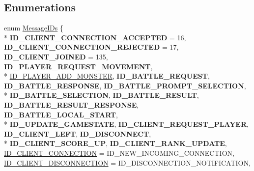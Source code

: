 \subsection*{Enumerations}
\begin{DoxyCompactItemize}
\item 
enum \hyperlink{namespace_champ_net_plugin_a2ade5cfa7cf6c25ab7236c6b54a57821}{Message\-I\-Ds} \{ \\*
{\bfseries I\-D\-\_\-\-C\-L\-I\-E\-N\-T\-\_\-\-C\-O\-N\-N\-E\-C\-T\-I\-O\-N\-\_\-\-A\-C\-C\-E\-P\-T\-E\-D} = 16, 
{\bfseries I\-D\-\_\-\-C\-L\-I\-E\-N\-T\-\_\-\-C\-O\-N\-N\-E\-C\-T\-I\-O\-N\-\_\-\-R\-E\-J\-E\-C\-T\-E\-D} = 17, 
{\bfseries I\-D\-\_\-\-C\-L\-I\-E\-N\-T\-\_\-\-J\-O\-I\-N\-E\-D} = 135, 
{\bfseries I\-D\-\_\-\-P\-L\-A\-Y\-E\-R\-\_\-\-R\-E\-Q\-U\-E\-S\-T\-\_\-\-M\-O\-V\-E\-M\-E\-N\-T}, 
\\*
\hyperlink{namespace_champ_net_plugin_a2ade5cfa7cf6c25ab7236c6b54a57821ad42c079bb7459dbaf419eeb2e845f3e2}{I\-D\-\_\-\-P\-L\-A\-Y\-E\-R\-\_\-\-A\-D\-D\-\_\-\-M\-O\-N\-S\-T\-E\-R}, 
{\bfseries I\-D\-\_\-\-B\-A\-T\-T\-L\-E\-\_\-\-R\-E\-Q\-U\-E\-S\-T}, 
{\bfseries I\-D\-\_\-\-B\-A\-T\-T\-L\-E\-\_\-\-R\-E\-S\-P\-O\-N\-S\-E}, 
{\bfseries I\-D\-\_\-\-B\-A\-T\-T\-L\-E\-\_\-\-P\-R\-O\-M\-P\-T\-\_\-\-S\-E\-L\-E\-C\-T\-I\-O\-N}, 
\\*
{\bfseries I\-D\-\_\-\-B\-A\-T\-T\-L\-E\-\_\-\-S\-E\-L\-E\-C\-T\-I\-O\-N}, 
{\bfseries I\-D\-\_\-\-B\-A\-T\-T\-L\-E\-\_\-\-R\-E\-S\-U\-L\-T}, 
{\bfseries I\-D\-\_\-\-B\-A\-T\-T\-L\-E\-\_\-\-R\-E\-S\-U\-L\-T\-\_\-\-R\-E\-S\-P\-O\-N\-S\-E}, 
{\bfseries I\-D\-\_\-\-B\-A\-T\-T\-L\-E\-\_\-\-L\-O\-C\-A\-L\-\_\-\-S\-T\-A\-R\-T}, 
\\*
{\bfseries I\-D\-\_\-\-U\-P\-D\-A\-T\-E\-\_\-\-G\-A\-M\-E\-S\-T\-A\-T\-E}, 
{\bfseries I\-D\-\_\-\-C\-L\-I\-E\-N\-T\-\_\-\-R\-E\-Q\-U\-E\-S\-T\-\_\-\-P\-L\-A\-Y\-E\-R}, 
{\bfseries I\-D\-\_\-\-C\-L\-I\-E\-N\-T\-\_\-\-L\-E\-F\-T}, 
{\bfseries I\-D\-\_\-\-D\-I\-S\-C\-O\-N\-N\-E\-C\-T}, 
\\*
{\bfseries I\-D\-\_\-\-C\-L\-I\-E\-N\-T\-\_\-\-S\-C\-O\-R\-E\-\_\-\-U\-P}, 
{\bfseries I\-D\-\_\-\-C\-L\-I\-E\-N\-T\-\_\-\-R\-A\-N\-K\-\_\-\-U\-P\-D\-A\-T\-E}, 
\hyperlink{namespace_champ_net_plugin_a2ade5cfa7cf6c25ab7236c6b54a57821aecc0564c52e3106cfe012e5533b080da}{I\-D\-\_\-\-C\-L\-I\-E\-N\-T\-\_\-\-C\-O\-N\-N\-E\-C\-T\-I\-O\-N} = I\-D\-\_\-\-N\-E\-W\-\_\-\-I\-N\-C\-O\-M\-I\-N\-G\-\_\-\-C\-O\-N\-N\-E\-C\-T\-I\-O\-N, 
\hyperlink{namespace_champ_net_plugin_a2ade5cfa7cf6c25ab7236c6b54a57821a2ed0fbbbbe782bca6c76277c89050ad9}{I\-D\-\_\-\-C\-L\-I\-E\-N\-T\-\_\-\-D\-I\-S\-C\-O\-N\-N\-E\-C\-T\-I\-O\-N} = I\-D\-\_\-\-D\-I\-S\-C\-O\-N\-N\-E\-C\-T\-I\-O\-N\-\_\-\-N\-O\-T\-I\-F\-I\-C\-A\-T\-I\-O\-N, 

\end{DoxyCompactItemize}
